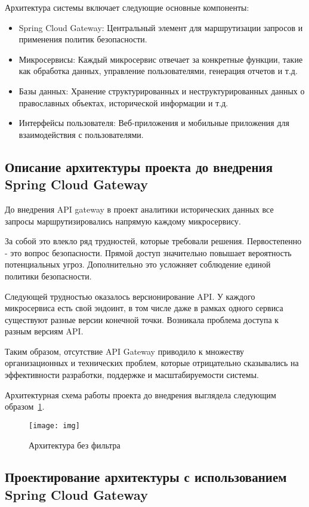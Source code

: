 Архитектура системы включает следующие основные компоненты:

\begin{itemize}
    \item Spring Cloud Gateway: Центральный элемент для маршрутизации запросов и применения политик безопасности.
    \item Микросервисы: Каждый микросервис отвечает за конкретные функции, такие как обработка данных, управление пользователями, генерация отчетов и т.д.
    \item Базы данных: Хранение структурированных и неструктурированных данных о православных объектах, исторической информации и т.д.
    \item Интерфейсы пользователя: Веб-приложения и мобильные приложения для взаимодействия с пользователями.
\end{itemize}

\subsection{Описание архитектуры проекта до внедрения Spring Cloud Gateway}

До внедрения API gateway в проект аналитики исторических данных все запросы маршрутизировались напрямую каждому микросервису.

За собой это влекло ряд трудностей, которые требовали решения.
Первостепенно - это вопрос безопасности.
Прямой доступ значительно повышает вероятность потенциальных угроз.
Дополнительно это усложняет соблюдение единой политики безопасности.

Следующей трудностью оказалось версионирование API. У каждого микросервиса есть свой эндоинт, в том числе даже в рамках одного сервиса существуют разные версии конечной точки.
Возникала проблема доступа к разным версиям API\@.

Таким образом, отсутствие API Gateway приводило к множеству организационных и технических проблем, которые отрицательно сказывались на эффективности разработки, поддержке и масштабируемости системы.

Архитектурная схема работы проекта до внедрения выглядела следующим образом~\ref{fig:without_gate}.

\begin{figure}[htbp]
    \centering
    \texttt{[image: img]}
    \caption{Архитектура без фильтра}
    \label{fig:without_gate}
\end{figure}

\subsection{Проектирование архитектуры с использованием Spring Cloud Gateway}

